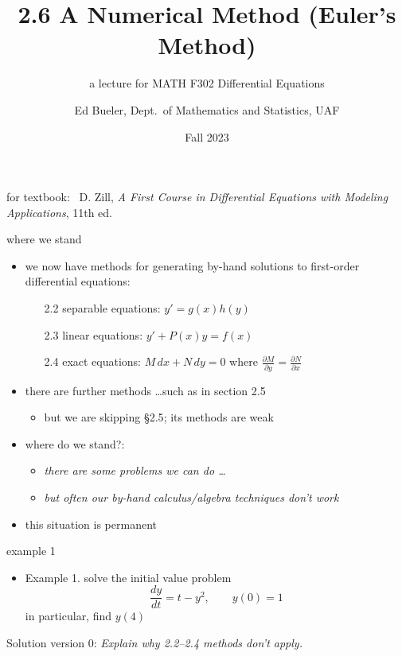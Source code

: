\documentclass{beamer}
\title{2.6 A Numerical Method (Euler's Method)}
\subtitle{a lecture for MATH F302 Differential Equations}
\author{Ed Bueler, Dept.~of Mathematics and Statistics, UAF}
\date{Fall 2023}
\begin{document}


\begin{frame}
\titlepage

\centerline{\tiny for textbook: \, D. Zill, \emph{A First Course in Differential Equations with Modeling Applications}, 11th ed.}
\end{frame}


\begin{frame}{where we stand}

\begin{itemize}
\item we now have methods for generating by-hand solutions to first-order differential equations:
    \begin{itemize}
    \item[2.2] separable equations: $y'=g(x)h(y)$
    \item[2.3] linear equations: $y'+P(x)y=f(x)$
    \item[2.4] exact equations: $M\,dx + N\,dy=0$ where $\frac{\partial M}{\partial y} = \frac{\partial N}{\partial x}$
    \end{itemize}
\item there are further methods \dots such as in section 2.5
    \begin{itemize}
    \item but \alert{we are skipping \S 2.5}; its methods are weak
    \end{itemize}

\bigskip
\item where do we stand?:
    \begin{itemize}
    \item \emph{there are some problems we can do \dots}
    \item \emph{but often our by-hand calculus/algebra techniques \alert{don't} work}
    \end{itemize}
\item this situation is permanent
\end{itemize}
\end{frame}


\begin{frame}{example 1}

\begin{itemize}
\item Example 1.  solve the initial value problem
    $$\frac{dy}{dt} = t-y^2, \qquad y(0)=1$$
in particular, find $y(4)$
\end{itemize}

\medskip
Solution version 0: \emph{Explain why 2.2--2.4 methods don't apply.}

\vspace{50mm}
\end{frame}
\end{document}
